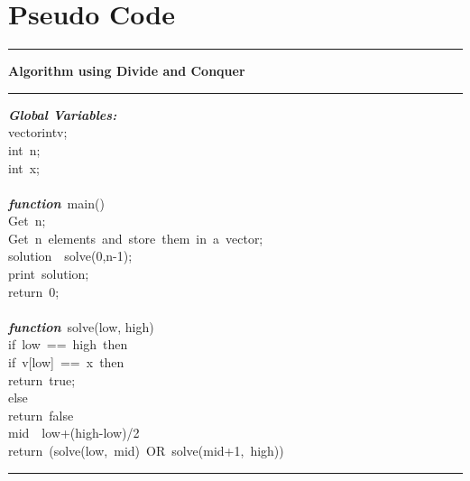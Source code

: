 \documentclass[conference]{IEEEtran}
\begin{document}
\section{Pseudo Code}
\vspace{5pt}
\hrule height 0.4pt depth 1pt width 250pt \relax
\vspace{5pt}
\textbf{Algorithm using Divide and Conquer}
\vspace{5pt}
\hrule height 0.4pt depth 1pt width 250pt \relax
\vspace{5pt}
\textbf{\textit{Global Variables:}}\\
\hspace*{6mm} vector\langle int\rangle v;\\
\hspace*{7mm} int\ n;\\
\hspace*{7mm} int\ x;\\
\\
\hspace*{4mm}\textbf{\textit{function}}\ main()\\
\hspace*{7mm}Get\ n;\\
\hspace*{7mm}Get\ n\ elements\ and\ store\ them\ in\ a\ vector;\\
\hspace*{7mm}solution\ \leftarrow\ solve(0,n-1);\\
\hspace*{7mm}print\ solution;\\
\hspace*{7mm}return\ 0;\\
\\
\hspace*{4mm}\textbf{\textit{function}}\ solve(low, high)\\
\hspace*{7mm}if\ low\ ==\ high\ then\\
\hspace*{10mm}if\ v[low]\ ==\ x\ then\\
\hspace*{13mm}return\ true;\\
\hspace*{10mm}else\\
\hspace*{13mm}return\ false\\
\hspace*{7mm}mid\ \leftarrow\ low+(high-low)/2\\
\hspace*{7mm}return\ (solve(low,\ mid)\ OR\ solve(mid+1,\ high))\\
\vspace{5pt}
\hrule height 0.4pt depth 1pt width 250pt \relax
\vspace{5pt}
\end{document}
